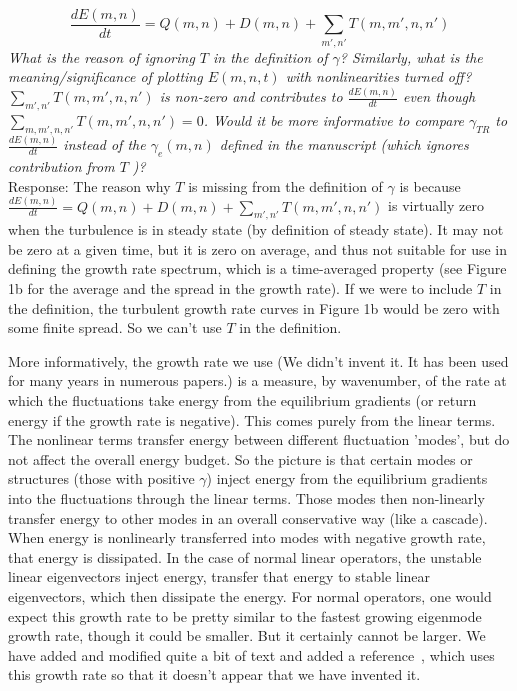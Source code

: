 \documentclass[12pt]{article}
\def\beq{\begin{equation}}
\def\eeq{\end{equation}}
\newcommand{\diff}[2]{\frac{d#1}{d#2}}
\begin{document}
\beq
\diff{E(m,n)}{t} = Q(m,n) + D(m,n) + \sum_{m',n'} T(m,m',n,n') \nonumber
\eeq
\emph{What is the reason of ignoring $T$ in the definition of $\gamma$? Similarly, what is the meaning/significance
of plotting $E(m, n, t)$ with nonlinearities turned off?  $\sum_{m',n'} T(m,m',n,n')$ is non-zero and contributes to 
$\diff{E(m, n)}{t}$ even though $\sum_{m,m',n,n'} T(m,m',n,n') = 0$. Would it be more informative
to compare $\gamma_{TR}$ to $\diff{E(m, n)}{t}$ instead of the $\gamma_e (m, n)$ defined in the manuscript (which ignores
contribution from $T$ )?} \\


Response: The reason why $T$ is missing from the definition of $\gamma$ is because $\diff{E(m,n)}{t} = Q(m,n) + D(m,n) + \sum_{m',n'} T(m,m',n,n')$ is virtually zero when the turbulence is in steady state (by definition of steady state). It may not be zero at a given time, but it is zero on average, and thus not suitable for use in defining the growth rate spectrum, which is a time-averaged property (see Figure 1b for the average and the spread in the growth rate). If we were to include $T$ in the definition, the turbulent growth rate curves in Figure 1b would be zero with some finite spread. So we can't use $T$ in the definition.

More informatively, the growth rate we use (We didn't invent it. It has been used for many years in numerous papers.) is a measure, by wavenumber, of the rate at which the fluctuations take energy from the equilibrium gradients (or return energy if the growth rate is negative). This comes purely from the linear terms. The nonlinear terms transfer energy between different fluctuation 'modes', but do not affect the overall energy budget.
So the picture is that certain modes or structures (those with positive $\gamma$) inject energy from the equilibrium gradients into the fluctuations through the linear terms. Those modes then non-linearly transfer energy to other modes in an overall conservative way (like a cascade). When energy is nonlinearly transferred into modes with negative growth rate, that energy is dissipated. In the case of normal linear operators, the unstable linear eigenvectors inject energy, transfer that energy to stable linear eigenvectors, which then dissipate the energy. For normal operators, one would expect this growth rate to be pretty similar to the fastest growing eigenmode growth rate, though it could be smaller. But it certainly cannot be larger. We have added and modified quite a bit of text and added a reference~\cite{terry2006b}, which uses this growth rate so that it doesn't appear that we have invented it.
\end{document}
